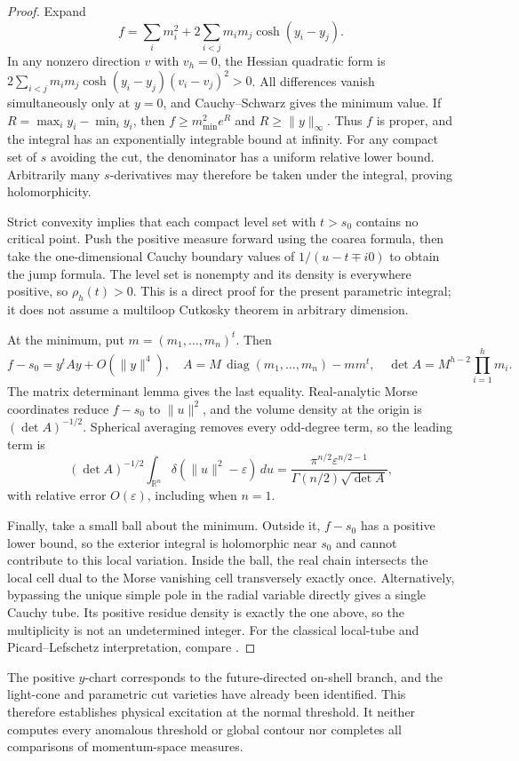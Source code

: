 \documentclass[11pt,a4paper,oneside]{article}
\theoremstyle{plain}
\theoremstyle{definition}
\theoremstyle{remark}
\numberwithin{equation}{section}
\begin{document}
\begin{proof}
Expand
\[
 f=\sum_i m_i^2+2\sum_{i<j}m_i m_j\cosh(y_i-y_j).
\]
In any nonzero direction $v$ with $v_h=0$, the Hessian quadratic form is
$2\sum_{i<j}m_i m_j\cosh(y_i-y_j)(v_i-v_j)^2>0$.
All differences vanish simultaneously only at $y=0$, and Cauchy--Schwarz gives the minimum value.
If $R=\max_i y_i-\min_i y_i$, then
$f\ge m_{\min}^2e^R$ and $R\ge\|y\|_\infty$.
Thus $f$ is proper, and the integral has an exponentially integrable bound at infinity.
For any compact set of $s$ avoiding the cut, the denominator has a uniform relative lower bound.
Arbitrarily many $s$-derivatives may therefore be taken under the integral, proving holomorphicity.

Strict convexity implies that each compact level set with $t>s_0$ contains no critical point.
Push the positive measure forward using the coarea formula, then take the one-dimensional Cauchy boundary values of $1/(u-t\mp i0)$
to obtain the jump formula. The level set is nonempty and its density is everywhere positive, so $\rho_h(t)>0$.
This is a direct proof for the present parametric integral; it does not assume a multiloop Cutkosky theorem in arbitrary dimension.

At the minimum, put $m=(m_1,\ldots,m_n)^t$. Then
\[
 f-s_0=y^tAy+O(\|y\|^4),\quad
 A=M\,\operatorname{diag}(m_1,\ldots,m_n)-mm^t,
 \quad \det A=M^{h-2}\prod_{i=1}^h m_i.
\]
The matrix determinant lemma gives the last equality.
Real-analytic Morse coordinates reduce $f-s_0$ to $\|u\|^2$,
and the volume density at the origin is $(\det A)^{-1/2}$.
Spherical averaging removes every odd-degree term, so the leading term is
\[
 (\det A)^{-1/2}
 \int_{\mathbb R^n}\delta(\|u\|^2-\varepsilon)\,du
 =\frac{\pi^{n/2}\varepsilon^{n/2-1}}
 {\Gamma(n/2)\sqrt{\det A}},
\]
with relative error $O(\varepsilon)$, including when $n=1$.

Finally, take a small ball about the minimum. Outside it, $f-s_0$ has a positive lower bound,
so the exterior integral is holomorphic near $s_0$ and cannot contribute to this local variation.
Inside the ball, the real chain intersects the local cell dual to the Morse vanishing cell transversely exactly once.
Alternatively, bypassing the unique simple pole in the radial variable directly gives a single Cauchy tube.
Its positive residue density is exactly the one above, so the multiplicity is not an undetermined integer.
For the classical local-tube and Picard--Lefschetz interpretation, compare \cite[\S2.3]{muhlbauer}.
\end{proof}
The positive $y$-chart corresponds to the future-directed on-shell branch, and the light-cone and parametric cut varieties have already been identified.
This therefore establishes physical excitation at the normal threshold.
It neither computes every anomalous threshold or global contour nor completes all comparisons of momentum-space measures.
\end{document}
